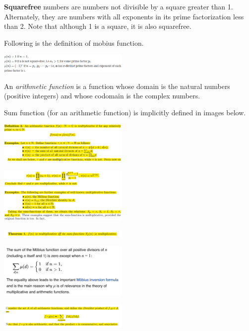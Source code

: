 \documentclass[8pt, a4paper, oneside, twocolumn]{extarticle}
\begin{document}
\textbf{Squarefree} numbers are numbers not divisible by a square greater than 1. Alternately, they are numbers with all exponents in its prime factorization less than 2. Note that although 1 is a square, it is also squarefree.

Following is the definition of mobius function.

\includegraphics[width=0.47\textwidth,height=0.47\textheight,keepaspectratio]{assets/mob0}

An \textit{arithmetic function} is a function whose domain is the natural numbers (positive integers) and whose codomain is the complex numbers. 

Sum function (for an arithmetic function) is implicitly defined in images below.

\includegraphics[width=0.47\textwidth,height=0.47\textheight,keepaspectratio]{assets/mob1}


\includegraphics[width=0.47\textwidth,height=0.47\textheight,keepaspectratio]{assets/mob2}


\includegraphics[width=0.47\textwidth,height=0.47\textheight,keepaspectratio]{assets/sumismul}

\includegraphics[width=0.47\textwidth,height=0.47\textheight,keepaspectratio]{assets/mobSum}

\includegraphics[width=0.47\textwidth,height=0.47\textheight,keepaspectratio]{assets/dirProd}
\end{document}
